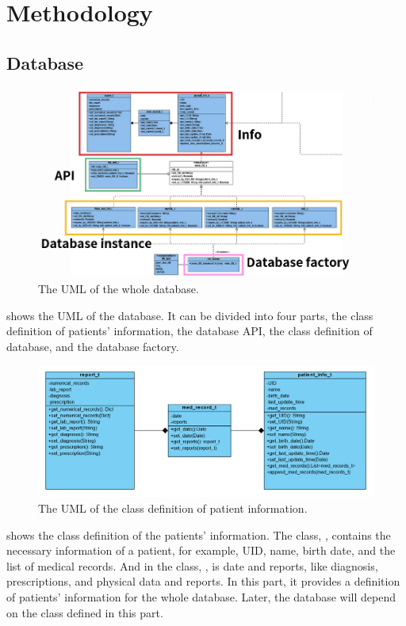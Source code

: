 \documentclass{article}
\begin{document}
\section{Methodology}
\label{sec:methodology}
  \subsection*{Database}
  \begin{figure}[ht]
    \centering
    \includegraphics[scale = 0.6]{asset/database/DB_UML.png}
    \caption{The UML of the whole database.}
    \label{fig:DB_UML}
  \end{figure}
   shows the UML of the database. It can be divided into four 
  parts, the class definition of patients' information, the database API, the 
  class definition of database, and the database factory. 

  \begin{figure}[ht]
    \centering
    \includegraphics[scale = 0.35]{asset/database/pinfo.png}
    \caption{The UML of the class definition of patient information.}
    \label{fig:pinfo_UML}
  \end{figure}
   shows the class definition of the patients' information. 
  The class, , contains the necessary information of 
  a patient, for example, UID, name, birth date, and the list of medical records. 
  And in the class, , is date and reports, like diagnosis, 
  prescriptions, and physical data and reports. 
  In this part, it provides a definition of patients' information for the whole 
  database. Later, the database will depend on the class defined in this part. 
\end{document}
